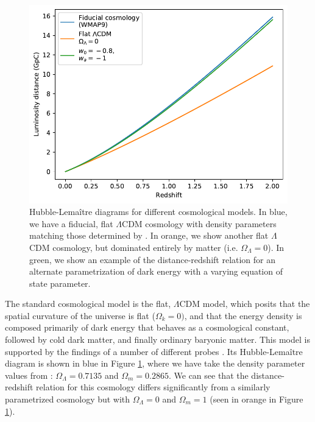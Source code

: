 \begin{figure}[htpb]
    \centering
    \includegraphics{figures/intro/hubble_diagram_examples.pdf}
    \caption{Hubble-Lema\^{i}tre diagrams for different cosmological models. In blue, we have a fiducial, flat $\Lambda$CDM cosmology with density parameters matching those determined by \citet{komatsu_five-year_2009}. In orange, we show another flat $\Lambda$CDM cosmology, but dominated entirely by matter (i.e. $\Omega_\Lambda=0$). In green, we show an example of the distance-redshift relation for an alternate parametrization of dark energy with a varying equation of state parameter.}
    \label{fig:hubble_diagram_examples}
\end{figure}

The standard cosmological model is the flat, $\Lambda$CDM model, which posits that the spatial curvature of the universe is flat ($\Omega_k=0)$, and that the energy density is composed primarily of dark energy that behaves as a cosmological constant, followed by cold dark matter, and finally ordinary baryonic matter. This model is supported by the findings of a number of different probes \citep{planck_collaboration_planck_2016, wittman_detection_2000, eisenstein_detection_2005}. Its Hubble-Lema\^{i}tre diagram is shown in blue in Figure \ref{fig:hubble_diagram_examples}, where we have take the density parameter values from \citet{komatsu_five-year_2009}: $\Omega_\Lambda = 0.7135$ and $\Omega_m = 0.2865$. We can see that the distance-redshift relation for this cosmology differs significantly from a similarly parametrized cosmology but with $\Omega_\Lambda=0$ and $\Omega_m=1$ (seen in orange in Figure \ref{fig:hubble_diagram_examples}).

